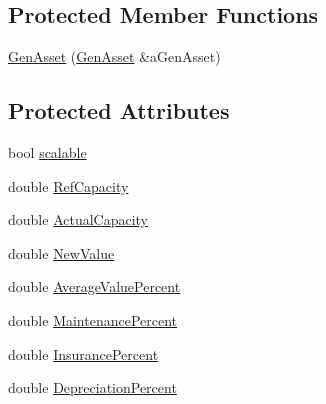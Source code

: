 \subsection*{Protected Member Functions}
\begin{DoxyCompactItemize}
\item 
\hyperlink{class_gen_asset_aeb05b8f8aee098518c6c0bea0f56a4ef}{GenAsset} (\hyperlink{class_gen_asset}{GenAsset} \&aGenAsset)
\end{DoxyCompactItemize}
\subsection*{Protected Attributes}
\begin{DoxyCompactItemize}
\item 
bool \hyperlink{class_gen_asset_abedb1420aea9a5c382e1cb277f569ef2}{scalable}
\item 
double \hyperlink{class_gen_asset_af92ef23136201ab80e6464a8749ca9ac}{RefCapacity}
\item 
double \hyperlink{class_gen_asset_a30d2c0daaa80f9bf473f0b59004f7f7c}{ActualCapacity}
\item 
double \hyperlink{class_gen_asset_acb87eeda54b9490a769f757383c36738}{NewValue}
\item 
double \hyperlink{class_gen_asset_af2acd76aebe81fd37a01be28753a1cfd}{AverageValuePercent}
\item 
double \hyperlink{class_gen_asset_a175efb0dff541ece6897022e94e7fa1e}{MaintenancePercent}
\item 
double \hyperlink{class_gen_asset_a4cc792433c9594704f995e25d7d0eb8c}{InsurancePercent}
\item 
double \hyperlink{class_gen_asset_a09731a3ecaca80962f3554314cf99649}{DepreciationPercent}
\end{DoxyCompactItemize}


